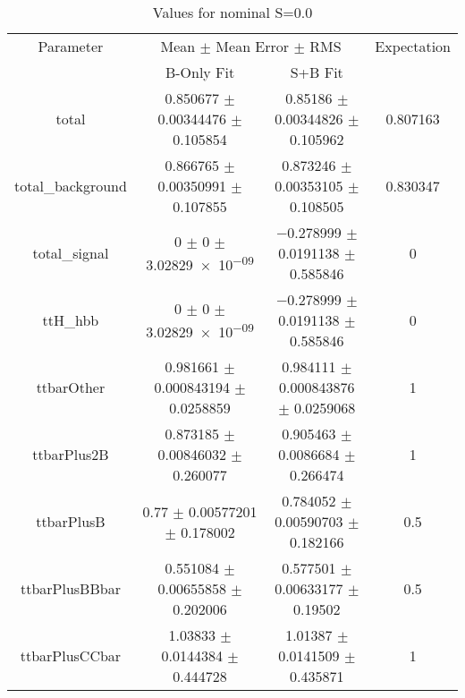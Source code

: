 \begin{table}
\centering
\caption{Values for nominal S=0.0}
\begin{tabular}{cccc}
\toprule
Parameter & \multicolumn{2}{c}{Mean $\pm$ Mean Error $\pm$ RMS} & Expectation\\
 & B-Only Fit & S+B Fit & \\
\midrule
total & \num{0.850677} $\pm$ \num{0.00344476} $\pm$ \num{0.105854} & \num{0.85186} $\pm$ \num{0.00344826} $\pm$ \num{0.105962} & \num{0.807163}\\
total\_background & \num{0.866765} $\pm$ \num{0.00350991} $\pm$ \num{0.107855} & \num{0.873246} $\pm$ \num{0.00353105} $\pm$ \num{0.108505} & \num{0.830347}\\
total\_signal & \num{0} $\pm$ \num{0} $\pm$ \num{3.02829e-09} & \num{-0.278999} $\pm$ \num{0.0191138} $\pm$ \num{0.585846} & \num{0}\\
ttH\_hbb & \num{0} $\pm$ \num{0} $\pm$ \num{3.02829e-09} & \num{-0.278999} $\pm$ \num{0.0191138} $\pm$ \num{0.585846} & \num{0}\\
ttbarOther & \num{0.981661} $\pm$ \num{0.000843194} $\pm$ \num{0.0258859} & \num{0.984111} $\pm$ \num{0.000843876} $\pm$ \num{0.0259068} & \num{1}\\
ttbarPlus2B & \num{0.873185} $\pm$ \num{0.00846032} $\pm$ \num{0.260077} & \num{0.905463} $\pm$ \num{0.0086684} $\pm$ \num{0.266474} & \num{1}\\
ttbarPlusB & \num{0.77} $\pm$ \num{0.00577201} $\pm$ \num{0.178002} & \num{0.784052} $\pm$ \num{0.00590703} $\pm$ \num{0.182166} & \num{0.5}\\
ttbarPlusBBbar & \num{0.551084} $\pm$ \num{0.00655858} $\pm$ \num{0.202006} & \num{0.577501} $\pm$ \num{0.00633177} $\pm$ \num{0.19502} & \num{0.5}\\
ttbarPlusCCbar & \num{1.03833} $\pm$ \num{0.0144384} $\pm$ \num{0.444728} & \num{1.01387} $\pm$ \num{0.0141509} $\pm$ \num{0.435871} & \num{1}\\
\bottomrule
\end{tabular}
\end{table}